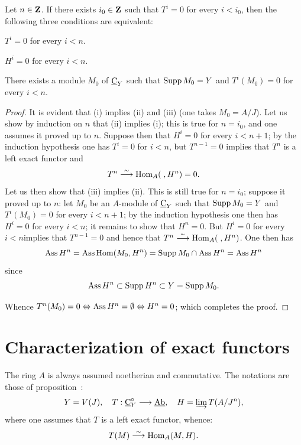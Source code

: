 \begin{theorem}
\label{IV.1.4} Let $n\in \mathbf{Z}$. If there exists $i_{0}\in \mathbf{Z}$ such that $T^{i}=0$ for every $i<i_{0}$, then the following three conditions are equivalent:
\begin{enumeratei}
\item
$T^{i}=0$ for every $i<n$.
\item
$H^{i}=0$ for every $i<n$.
\item
There exists a module $M_{0}$ of $\underline{\mathrm{C}}_{Y}$ such that $\operatorname{Supp} M_{0}=Y$ and $T^{i}(M_{0})=0$ for every $i<n$.
\end{enumeratei}
\end{theorem}

\begin{proof}
It is evident that (i) implies (ii) and (iii) (one takes $M_{0}=A/J$). Let us show by induction on $n$ that (ii) implies (i); this is true for $n=i_{0}$, and one assumes it proved up to $n$. Suppose then that $H^{i}=0$ for every $i<n+1$; by the induction hypothesis one has $T^{i}=0$ for $i<n$, but $T^{n-1}=0$ implies that $T^{n}$ is a left exact functor and
\begin{equation*} T^{n}\overset{\sim}{\longrightarrow}\operatorname{Hom}_{A}(\;, H^{n})=0.
\end{equation*}
Let us then show that (iii) implies (ii). This is still true for $n=i_{0}$; suppose it proved up to $n$: let $M_{0}$ be an $A$-module of $\underline{\mathrm{C}}_{Y}$ such that $\operatorname{Supp} M_{0}=Y$ and $T^{i}(M_{0})=0$ for every $i<n+1$; by the induction hypothesis one then has $H^{i}=0$ for every $i<n$; it remains to show that $H^{n}=0$. But \og $H^{i}=0$ for every $i<n$\fg implies that $T^{n-1}=0$ and hence that $T^{n}\overset{\sim}{\longrightarrow}\operatorname{Hom}_{A}(\;, H^{n})$. One then has
\begin{equation*}
\operatorname{Ass} H^{n}=\operatorname{Ass} \operatorname{Hom}(M_{0}, H^{n})=\operatorname{Supp} M_{0}\cap \operatorname{Ass} H^{n}= \operatorname{Ass} H^{n}
\end{equation*}
since
\begin{equation*}
\operatorname{Ass} H^{n}\subset \operatorname{Supp} H^{n}\subset Y= \operatorname{Supp} M_{0}.
\end{equation*}

Whence $T^{n}(M_{0})=0\Ssi \Ass H^{n}=\emptyset \Ssi H^{n}=0$; which completes the proof.
\skipqed
\end{proof}

\section{Characterization of exact functors} \label{IV.2}

The ring $A$ is always assumed noetherian and commutative. The notations are those of proposition~:
\begin{equation*} Y=V(J), \quad T:\ccat_{Y}^{\circ}\to \Ab, \quad H=\varinjlim T(A/J^{n}),
\end{equation*}
where one assumes that $T$ is a left exact functor, whence:
\begin{equation*} T(M)\overset{\sim}{\longrightarrow} \operatorname{Hom}_{A}(M, H).
\end{equation*}

